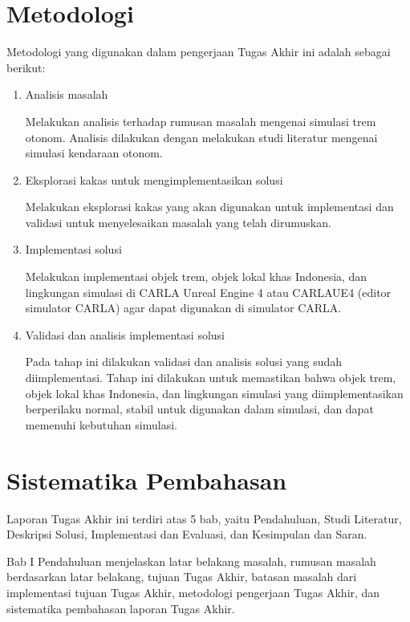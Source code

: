 \section{Metodologi}

Metodologi yang digunakan dalam pengerjaan Tugas Akhir ini adalah sebagai
berikut:

\begin{enumerate}

    \item Analisis masalah

    Melakukan analisis terhadap rumusan masalah mengenai simulasi trem otonom.
    Analisis dilakukan dengan melakukan studi literatur mengenai simulasi
    kendaraan otonom.

    \item Eksplorasi kakas untuk mengimplementasikan solusi

    Melakukan eksplorasi kakas yang akan digunakan untuk implementasi dan
    validasi untuk menyelesaikan masalah yang telah dirumuskan.

    \item Implementasi solusi

    Melakukan implementasi objek trem, objek lokal khas Indonesia, dan
    lingkungan simulasi di CARLA Unreal Engine 4 atau CARLAUE4 (editor simulator
    CARLA) agar dapat digunakan di simulator CARLA.

    \item Validasi dan analisis implementasi solusi

    Pada tahap ini dilakukan validasi dan analisis solusi yang sudah
    diimplementasi. Tahap ini dilakukan untuk memastikan bahwa objek trem, objek
    lokal khas Indonesia, dan lingkungan simulasi yang diimplementasikan
    berperilaku normal, stabil untuk digunakan dalam simulasi, dan dapat
    memenuhi kebutuhan simulasi.

\end{enumerate}

\section{Sistematika Pembahasan}

Laporan Tugas Akhir ini terdiri atas 5 bab, yaitu Pendahuluan, Studi Literatur,
Deskripsi Solusi, Implementasi dan Evaluasi, dan Kesimpulan dan Saran.

Bab I Pendahuluan menjelaskan latar belakang masalah, rumusan masalah
berdasarkan latar belakang, tujuan Tugas Akhir, batasan masalah dari
implementasi tujuan Tugas Akhir, metodologi pengerjaan Tugas Akhir, dan
sistematika pembahasan laporan Tugas Akhir.

